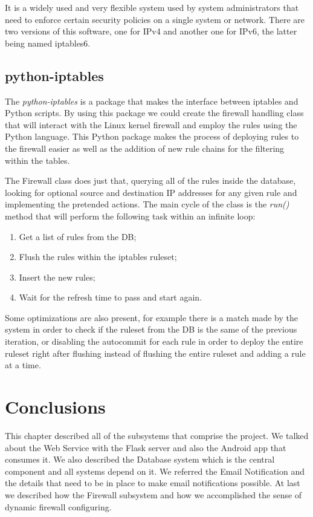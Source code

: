 It is a widely used and very flexible system used by system administrators that
need to enforce certain security policies on a single system or network. There
are two versions of this software, one for IPv4 and another one for IPv6, the
latter being named iptables6.

\subsection{python-iptables}
\label{chap4:sec:firewall-sys:sub:iptc}
The \emph{python-iptables} is a package that makes the interface between
iptables and Python scripts. By using this package we could create the firewall
handling class that will interact with the Linux kernel firewall and employ the
rules using the Python language.
This Python package makes the process of deploying rules to the firewall easier
as well as the addition of new rule chains for the filtering within the tables.

The Firewall class does just that, querying all of the rules inside the
database, looking for optional source and destination IP addresses for any given
rule and implementing the pretended actions.
The main cycle of the class is the \emph{run()} method that will perform the
following task within an infinite loop:

\begin{enumerate}
	\item Get a list of rules from the DB;
	\item Flush the rules within the iptables ruleset;
	\item Insert the new rules;
	\item Wait for the refresh time to pass and start again.
\end{enumerate}

Some optimizations are also present, for example there is a match made by the
system in order to check if the ruleset from the DB is the same of the previous
iteration, or disabling the autocommit for each rule in order to deploy the
entire ruleset right after flushing instead of flushing the entire ruleset and
adding a rule at a time.


\section{Conclusions}
\label{chap4:sec:concs}
This chapter described all of the subsystems that comprise the project. We
talked about the Web Service with the Flask server and also the Android app that
consumes it. We also described the Database system which is the central
component and all systems depend on it. We referred the Email Notification and
the details that need to be in place to make email notifications possible. At
last we described how the Firewall subsystem and how we accomplished the sense
of dynamic firewall configuring.
